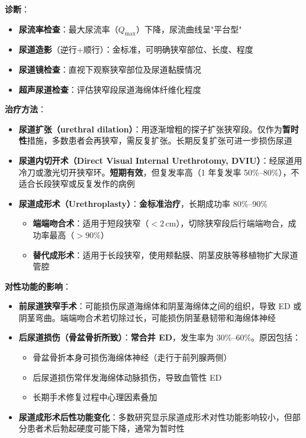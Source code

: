 \begin{enumerate}
\vspace{0.5em}
\noindent\textbf{诊断}：
\begin{itemize}[leftmargin=2cm]
	\item \textbf{尿流率检查}：最大尿流率（$Q_{\max}$）下降，尿流曲线呈"平台型"
	\item \textbf{尿道造影}（逆行+顺行）：金标准，可明确狭窄部位、长度、程度
	\item \textbf{尿道镜检查}：直视下观察狭窄部位及尿道黏膜情况
	\item \textbf{超声尿道检查}：评估狭窄段尿道海绵体纤维化程度
\end{itemize}

\vspace{0.5em}
\noindent\textbf{治疗方法}：

\begin{itemize}[leftmargin=2cm]
	\item \textbf{尿道扩张（urethral dilation）}：用逐渐增粗的探子扩张狭窄段。仅作为\textbf{暂时性}措施，多数患者会再狭窄，需反复扩张。长期反复扩张可进一步损伤尿道
	\item \textbf{尿道内切开术（Direct Visual Internal Urethrotomy, DVIU）}：经尿道用冷刀或激光切开狭窄环。\textbf{短期有效}，但复发率高（1 年复发率 50\%--80\%），不适合长段狭窄或反复发作的病例
	\item \textbf{尿道成形术（Urethroplasty）}：\textbf{金标准治疗}，长期成功率 80\%--90\%
	\begin{itemize}
		\item \textbf{端端吻合术}：适用于短段狭窄（$<2\,$cm），切除狭窄段后行端端吻合，成功率最高（$>90\%$）
		\item \textbf{替代成形术}：适用于长段狭窄，使用颊黏膜、阴茎皮肤等移植物扩大尿道管腔
	\end{itemize}
\end{itemize}

\vspace{0.5em}
\noindent\textbf{对性功能的影响}：

\begin{itemize}[leftmargin=2cm]
	\item \textbf{前尿道狭窄手术}：可能损伤尿道海绵体和阴茎海绵体之间的组织，导致 ED 或阴茎弯曲。端端吻合术若切除过长，可能损伤阴茎悬韧带和海绵体神经
	\item \textbf{后尿道损伤（骨盆骨折所致）}：\textbf{常合并 ED}，发生率为 30\%--60\%。原因包括：
	\begin{itemize}
		\item 骨盆骨折本身可损伤海绵体神经（走行于前列腺两侧）
		\item 后尿道损伤常伴发海绵体动脉损伤，导致血管性 ED
		\item 长期手术修复过程中心理因素叠加
	\end{itemize}
	\item \textbf{尿道成形术后性功能变化}：多数研究显示尿道成形术对性功能影响较小，但部分患者术后勃起硬度可能下降，通常为暂时性
\end{itemize}


\end{enumerate}
